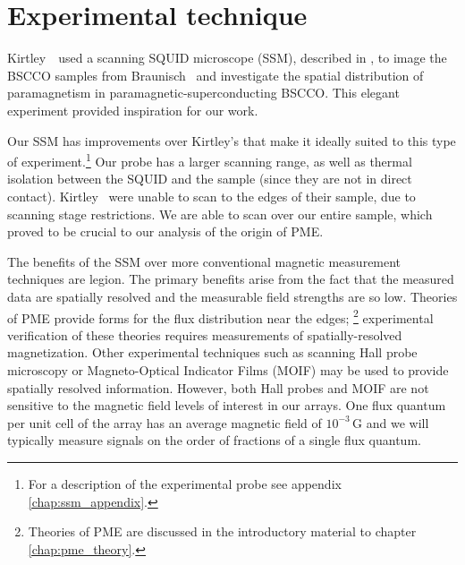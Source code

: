 \section{Experimental technique}
\label{sec:exp_method}

Kirtley \etal\,\cite{kirtley_jpcm_10_L97_1998}\ used a scanning SQUID
microscope (SSM), described in ,
to image the BSCCO samples from Braunisch\etal 
\cite{braunisch_prl_68_1908_1992,braunisch_prb_48_4030_1993}\
and investigate the spatial distribution of paramagnetism in 
paramagnetic-superconducting BSCCO. This elegant experiment
provided inspiration for our work.

Our SSM has improvements over Kirtley's that make it ideally suited to
this type of experiment.\footnote{For a description of the 
experimental probe see
appendix \ref{chap:ssm_appendix}.} 
Our probe has a larger scanning 
range, as well as thermal isolation between the SQUID and the sample
(since they are not in direct contact).
 Kirtley \etal\ were unable to scan to the
edges of their sample, due to scanning stage restrictions. We are
able to scan over our entire sample, which proved to be crucial
to our analysis of the origin of PME. 

The benefits of the SSM over more conventional magnetic measurement techniques 
are legion. The primary benefits arise from the fact that
the measured data are spatially resolved and the 
measurable field strengths are so low. 
Theories of PME
provide forms for the flux distribution
near the edges;%
\footnote{Theories of PME are discussed in the introductory material to
chapter \ref{chap:pme_theory}.} 
experimental verification
of these theories requires measurements of spatially-resolved magnetization. 
Other experimental techniques such as scanning Hall probe microscopy or
Magneto-Optical Indicator Films (MOIF) may be used to provide spatially
resolved information. However, both Hall probes and MOIF are not sensitive
to the magnetic field levels of interest in our arrays. 
One flux quantum per unit cell of the array has an average magnetic field
of $10^{-3}\,\mathrm{G}$ and we will typically measure 
signals on the order of
fractions of a single flux quantum. 

